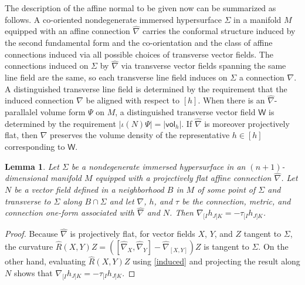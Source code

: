 \documentclass [leqno, 10pt]{amsart}
\newtheorem{lemma}[theorem]{Lemma}
\theoremstyle{definition}
\numberwithin{equation}{section}
\newcommand{\imt}{\iota}
\newcommand{\vol}{\mathsf{vol}}
\newcommand{\nm}{\mathsf{W}}
\newcommand{\hnabla}{\widehat{\nabla}}
\begin{document}
The description of the affine normal to be given now can be summarized as follows. A co-oriented nondegenerate immersed hypersurface $\Sigma$ in a manifold $M$ equipped with an affine connection $\hnabla$ carries the conformal structure induced by the second fundamental form and the co-orientation and the class of affine connections induced via all possible choices of transverse vector fields. The connections induced on $\Sigma$ by $\hnabla$ via transverse vector fields spanning the same line field are the same, so each transverse line field induces on $\Sigma$ a connection $\nabla$. A distinguished transverse line field is determined by the requirement that the induced connection $\nabla$ be aligned with respect to $[h]$. When there is an $\hnabla$-parallalel volume form $\Psi$ on $M$, a distinguished transverse vector field $\nm$ is determined by the requirement $|\imt(N)\Psi| = |\vol_{h}|$. If $\hnabla$ is moreover projectively flat, then $\nabla$ preserves the volume density of the representative $h\in [h]$ corresponding to $\nm$.

\begin{lemma}\label{taulemma}
Let $\Sigma$ be a nondegenerate immersed hypersurface in an $(n+1)$-dimensional manifold $M$ equipped with a projectively flat affine connection $\hnabla$. Let $N$ be a vector field defined in a neighborhood $B$ in $M$ of some point of $\Sigma$ and transverse to $\Sigma$ along $B \cap \Sigma$ and let $\nabla$, $h$, and $\tau$ be the connection, metric, and connection one-form associated with $\hnabla$ and $N$. Then $\nabla_{[I}h_{J]K} = -\tau_{[I}h_{J]K}$.
\end{lemma}
\begin{proof}
Because $\hnabla$ is projectively flat, for vector fields $X$, $Y$, and $Z$ tangent to $\Sigma$, the curvature $\hat{R}(X, Y)Z = ([\hnabla_{X}, \hnabla_{Y}] - \hnabla_{[X, Y]})Z$ is tangent to $\Sigma$. On the other hand, evaluating $\hat{R}(X, Y)Z$ using \eqref{induced} and projecting the result along $N$ shows that $\nabla_{[I}h_{J]K} = -\tau_{[I}h_{J]K}$.
\end{proof}
\end{document}
